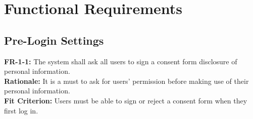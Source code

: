 \documentclass[12pt]{article}
\begin{document}
\section{Functional Requirements}
\subsection{Pre-Login Settings}
    \textbf{FR-1-1:} The system shall ask all users to sign a consent form disclosure of personal information.\\
    \textbf{Rationale:} It is a must to ask for users' permission before making use of their personal information.\\
    \textbf{Fit Criterion:} Users must be able to sign or reject a consent form when they first log in.\\\\
    
\end{document}
